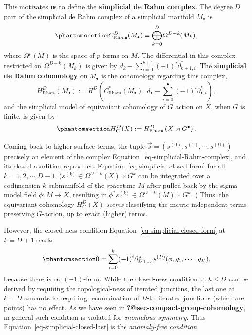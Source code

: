 \documentclass[
  letterpaper,
  DIV=11,
  numbers=noendperiod]{scrreport}
\begin{document}
This motivates us to define the \textbf{simplicial de Rahm complex}. The
degree \(D\) part of the simplicial de Rahm complex of a simplicial
manifold \(M_\bullet\) is
\begin{equation}\phantomsection\label{eq-simplicial-Rahm-complex}{
C^{D}_\text{Rham}(M_\bullet) = \bigoplus_{k=0}^{D}\Omega^{D-k}(M_k),
}\end{equation} where \(\Omega^p(M)\) is the space of \(p\)-forms on
\(M\). The differential in this complex restricted on
\(\Omega^{D-k}(M_k)\) is given by
\(d_k - \sum_{i=0}^{k+1} (-1)^i \partial_{k+1,i}^*\). The
\textbf{simplicial de Rahm cohomology} on \(M_\bullet\) is the
cohomology regarding this complex, \[
H_\text{Rham}^D(M_\bullet) := H^D\left(C^*_\text{Rham}(M_\bullet) ,\, d_\bullet - \sum_{i=0}^\bullet (-1)^i \partial_{\bullet,i}^*\right),
\] and the simplicial model of equivariant cohomology of \(G\) action on
\(X\), when \(G\) is finite, is given by
\begin{equation}\phantomsection\label{eq-equivariant-borel}{
H_G^D(X) := H_\text{Rham}^D\left(X\rtimes G^\bullet\right).
}\end{equation}

Coming back to higher surface terms, the tuple
\(\vec{s} = (s^{(0)},s^{(1)},\cdots, s^{(D)})\) precisely an element of
the complex Equation~\ref{eq-simplicial-Rahm-complex}, and its closed
condition reproduces Equation~\ref{eq-simplicial-closed-form} for all
\(k=1,2,\cdots, D-1\). (\(s^{(k)} \in \Omega^{D-k}(X)\times G^k\) can be
integrated over a codimension-\(k\) submanifold of the spacetime \(M\)
after pulled back by the sigma model field \(\phi : M \to X\), resulting
in \(\phi^* s^{(k)} \in  \Omega^{D-k}(M)\times G^k\). ) Thus, the
equivariant cohomology \(H_G^D(X)\) \emph{seems} classifying the
metric-independent terms preserving \(G\)-action, up to exact (higher)
terms.

However, the closed-ness condition
Equation~\ref{eq-simplicial-closed-form} at \(k=D+1\) reads
\begin{equation}\phantomsection\label{eq-simplicial-closed-last}{
0 = \sum_{i=0}^{k} (-1)^{i} \partial_{D+1,i}^* s^{(D)}(\phi,g_1,\cdots,g_D),
}\end{equation} because there is no \((-1)\)-form. While the closed-ness
condition at \(k \le D\) can be derived by requiring the
topological-ness of iterated junctions, the last one at \(k=D\) amounts
to requiring recombination of \(D\)-th iterated junctions (which are
points) has no effect. As we have seen in
\textbf{?@sec-compact-group-cohomology}, in general such condition is
violated for \emph{anomalous symmetry}. Thus
Equation~\ref{eq-simplicial-closed-last} is the \emph{anomaly-free
condition}.
\end{document}
